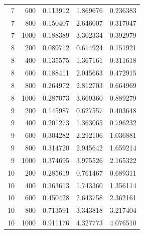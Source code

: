 \begin{table}[t]
\begin{tabular}{rrrrr}
7 & 600 & 0.113912 & 1.869676 & 0.236383 \\
7 & 800 & 0.150407 & 2.646007 & 0.317047 \\
7 & 1000 & 0.188389 & 3.302334 & 0.392979 \\
8 & 200 & 0.089712 & 0.614924 & 0.151921 \\
8 & 400 & 0.135575 & 1.367161 & 0.311618 \\
8 & 600 & 0.188411 & 2.045663 & 0.472915 \\
8 & 800 & 0.264972 & 2.812703 & 0.664969 \\
8 & 1000 & 0.287073 & 3.669360 & 0.889279 \\
9 & 200 & 0.145987 & 0.627557 & 0.403648 \\
9 & 400 & 0.201273 & 1.363065 & 0.796232 \\
9 & 600 & 0.304282 & 2.292106 & 1.036881 \\
9 & 800 & 0.314720 & 2.945642 & 1.659214 \\
9 & 1000 & 0.374695 & 3.975526 & 2.165322 \\
10 & 200 & 0.285619 & 0.761467 & 0.689311 \\
10 & 400 & 0.363613 & 1.743360 & 1.356114 \\
10 & 600 & 0.450428 & 2.643758 & 2.362161 \\
10 & 800 & 0.713591 & 3.343818 & 3.217404 \\
10 & 1000 & 0.911176 & 4.327773 & 4.076510 \\
\bottomrule
\end{tabular}
\end{table}
